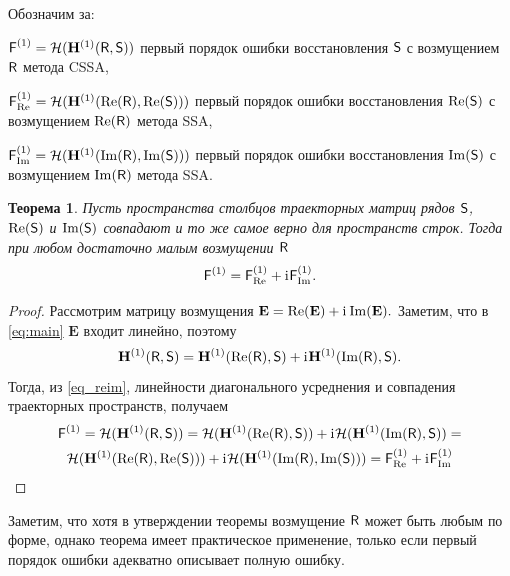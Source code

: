 \documentclass[specialist,
               substylefile = spbu.rtx,
               subf,href,colorlinks=true, 12pt]{disser}
\newtheorem{theorem}{Теорема}
\newtheorem*{notice*}{Замечание}
\begin{document}
Обозначим за:

$\textsf{F}^{(1)} = \mathcal{H}(\mathbf{H}^{(1)}(\textsf{R}, \textsf{S}))$ первый порядок ошибки восстановления $\textsf{S}$ с возмущением $\textsf{R}$ метода CSSA,

$\textsf{F}^{(1)}_{\Re} = \mathcal{H}(\mathbf{H}^{(1)}(\Re(\textsf{R}), \Re(\textsf{S})))$ первый порядок ошибки восстановления $\Re(\textsf{S})$ с возмущением $\Re(\textsf{R})$ метода SSA,

$\textsf{F}^{(1)}_{\Im} = \mathcal{H}(\mathbf{H}^{(1)}(\Im(\textsf{R}), \Im(\textsf{S})))$ первый порядок ошибки восстановления $\Im(\textsf{S})$ с возмущением $\Im(\textsf{R})$ метода SSA.


\begin{theorem}\label{th:sum}
	Пусть пространства столбцов траекторных матриц рядов $\textsf{S}$, $\Re(\textsf{S})$ и $\Im(\textsf{S})$ совпадают и то же самое верно для пространств строк.
	Тогда при любом достаточно малым возмущении $\textsf{R}$ $$\textsf{F}^{(1)} = \textsf{F}^{(1)}_{\Re} + \mathrm{i}\mkern1mu\textsf{F}^{(1)}_{\Im}.$$
\end{theorem}
\begin{proof}
	Рассмотрим матрицу возмущения $\mathbf{E} = \Re(\mathbf{E}) + \mathrm{i}\mkern1mu\Im(\mathbf{E}).$
	Заметим, что в \eqref{eq:main} $\mathbf{E}$ входит линейно, поэтому
	\begin{equation} \label{eq_reim}
		\mathbf{H}^{(1)}(\textsf{R}, \textsf{S}) = \mathbf{H}^{(1)}(\Re(\textsf{R}), \textsf{S}) + \mathrm{i}\mkern1mu\mathbf{H}^{(1)}(\Im(\textsf{R}), \textsf{S}).
	\end{equation}
	Тогда, из \eqref{eq_reim}, линейности диагонального усреднения и  совпадения траекторных пространств, получаем
	\begin{multline*}
		\textsf{F}^{(1)} = \mathcal{H}(\mathbf{H}^{(1)}(\textsf{R}, \textsf{S})) = \mathcal{H}(\mathbf{H}^{(1)}(\Re(\textsf{R}), \textsf{S})) + \mathrm{i}\mkern1mu\mathcal{H}(\mathbf{H}^{(1)}(\Im(\textsf{R}), \textsf{S})) =\\
		\mathcal{H}(\mathbf{H}^{(1)}(\Re(\textsf{R}), \Re(\textsf{S}))) + \mathrm{i}\mkern1mu\mathcal{H}(\mathbf{H}^{(1)}(\Im(\textsf{R}), \Im(\textsf{S}))) = \textsf{F}^{(1)}_{\Re} + \mathrm{i}\mkern1mu\textsf{F}^{(1)}_{\Im}	
	\end{multline*}
	
\end{proof}

Заметим, что хотя в утверждении теоремы возмущение $\textsf{R}$ может быть любым по форме, однако теорема имеет практическое применение, только если первый порядок ошибки адекватно описывает полную ошибку.

\end{document}
